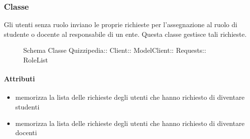 \subsubsection{Classe }
Gli utenti senza ruolo inviano le proprie richieste per l'assegnazione al ruolo di studente o docente al responsabile di un ente. Questa classe gestisce tali richieste.
\begin{figure}[H]
\centering
\noindent{}
\caption[Schema Classe RoleList]{Schema Classe Quizzipedia:: Client:: ModelClient:: Requests:: RoleList}
\end{figure}
\paragraph{Attributi}
\begin{itemize}
\item {}
\newline
memorizza la lista delle richieste degli utenti che hanno richiesto di diventare studenti
\item {}
\newline
memorizza la lista delle richieste degli utenti che hanno richiesto di diventare docenti
\end{itemize}
